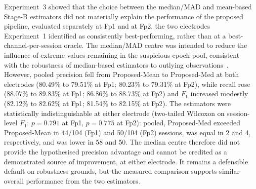 Experiment~3 showed that the choice between the median/MAD and mean-based Stage-B estimators did not materially explain the performance of the proposed pipeline, evaluated separately at Fp1 and at Fp2, the two electrodes Experiment~1 identified as consistently best-performing, rather than at a best-channel-per-session oracle. The median/MAD centre was intended to reduce the influence of extreme values remaining in the suspicious-epoch pool, consistent with the robustness of median-based estimators to outlying observations~\citep{leys2013detecting,rousseeuw1993alternatives}. However, pooled precision fell from Proposed-Mean to Proposed-Med at both electrodes (80.49\% to 79.51\% at Fp1; 80.23\% to 79.31\% at Fp2), while recall rose (88.07\% to 89.83\% at Fp1; 86.86\% to 88.73\% at Fp2) and $F_1$ increased modestly (82.12\% to 82.62\% at Fp1; 81.54\% to 82.15\% at Fp2). The estimators were statistically indistinguishable at either electrode (two-tailed Wilcoxon on session-level $F_1$: $p=0.791$ at Fp1, $p=0.775$ at Fp2): pooled, Proposed-Med exceeded Proposed-Mean in 44/104 (Fp1) and 50/104 (Fp2) sessions, was equal in 2 and 4, respectively, and was lower in 58 and 50. The median centre therefore did not provide the hypothesised precision advantage and cannot be credited as a demonstrated source of improvement, at either electrode. It remains a defensible default on robustness grounds, but the measured comparison supports similar overall performance from the two estimators.
